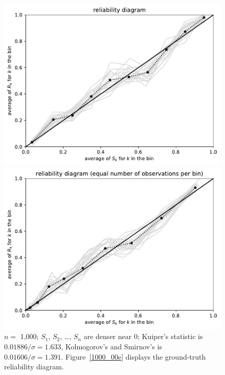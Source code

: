 \documentclass{article}
\begin{document}
\begin{figure}
\begin{centering}
\parbox{\imsize}{\includegraphics[width=\imsize]
                {./codes/unweighted/1000_10_1_3/equiprob.pdf}}
\quad\quad
\parbox{\imsize}{\includegraphics[width=\imsize]
                {./codes/unweighted/1000_10_1_3/equisamp.pdf}}

\end{centering}
\caption{$n =$ 1,000; $S_1$, $S_2$, \dots, $S_n$ are denser near 0;
         Kuiper's statistic is $0.01886 / \sigma = 1.633$,
         Kolmogorov's and Smirnov's is $0.01606 / \sigma = 1.391$.
Figure~\ref{1000_00e} displays the ground-truth reliability diagram.
}
\label{1000_00}
\end{figure}
\end{document}
